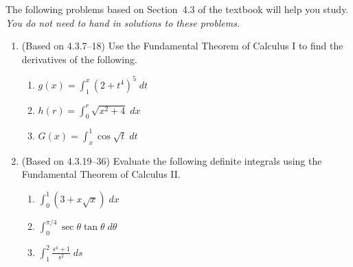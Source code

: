 \documentclass{article}
\title{\commonPSTitleZeroFourThree}
\author{\commonAuthor}
\date{\commonDateZeroFourThree}
\newcommand{\ds}{\displaystyle}
\begin{document}
\maketitle
\thispagestyle{empty}

\noindent
The following problems based on Section~4.3 of the textbook will help
you study.  \emph{You do not need to hand in solutions to these
  problems.}
\begin{enumerate}
\item (Based on 4.3.7--18) %
  Use the Fundamental Theorem of Calculus I to find the derivatives
  of the following.
  \begin{multicols}{3}
  \begin{enumerate}
  \item $\ds g(x)=\int_1^x (2+t^4)^5 \; dt$
  \item $\ds h(r)=\int_0^r \sqrt{x^2+4} \; dx$
  \item $\ds G(x) = \int_x^1 \cos \sqrt{t} \; dt$
  \end{enumerate}
  \end{multicols}
\item (Based on 4.3.19--36) %
  Evaluate the following definite integrals using the Fundamental
  Theorem of Calculus II.
  \begin{multicols}{3}
  \begin{enumerate}
  \item $\ds \int_0^1 (3+x\sqrt{x}) \; dx$
  \item $\ds \int_0^{\pi/4} \sec\theta \tan\theta \; d\theta$
  \item $\ds \int_1^2 \frac{s^4+1}{s^2} \; ds$
  \end{enumerate}
  \end{multicols}

\end{enumerate}
\end{document}
